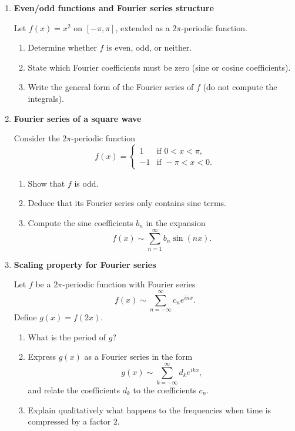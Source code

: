 \documentclass[11pt]{article}
\begin{document}
\begin{enumerate}
\item \textbf{Even/odd functions and Fourier series structure}

Let \( f(x)=x^2 \) on \( [-\pi,\pi] \), extended as a \(2\pi\)-periodic function.

\begin{enumerate}
\item Determine whether \(f\) is even, odd, or neither.
\item State which Fourier coefficients must be zero (sine or cosine coefficients).
\item Write the general form of the Fourier series of \(f\) (do not compute the integrals).
\end{enumerate}

\bigskip
\item \textbf{Fourier series of a square wave}

Consider the \(2\pi\)-periodic function
\[
f(x)=
\begin{cases}
1 & \text{if } 0<x<\pi, \\
-1 & \text{if } -\pi<x<0.
\end{cases}
\]

\begin{enumerate}
\item Show that \(f\) is odd.
\item Deduce that its Fourier series only contains sine terms.
\item Compute the sine coefficients \(b_n\) in the expansion
\[
f(x)\sim \sum_{n=1}^{\infty} b_n \sin(nx).
\]
\end{enumerate}

\bigskip
\item \textbf{Scaling property for Fourier series}

Let \(f\) be a \(2\pi\)-periodic function with Fourier series
\[
f(x) \sim \sum_{n=-\infty}^{\infty} c_n e^{inx}.
\]
Define \(g(x)=f(2x)\).

\begin{enumerate}
\item What is the period of \(g\)?
\item Express \(g(x)\) as a Fourier series in the form
\[
g(x) \sim \sum_{k=-\infty}^{\infty} d_k e^{ikx},
\]
and relate the coefficients \(d_k\) to the coefficients \(c_n\).
\item Explain qualitatively what happens to the frequencies when time is compressed by a factor \(2\).
\end{enumerate}


\end{enumerate}
\end{document}
